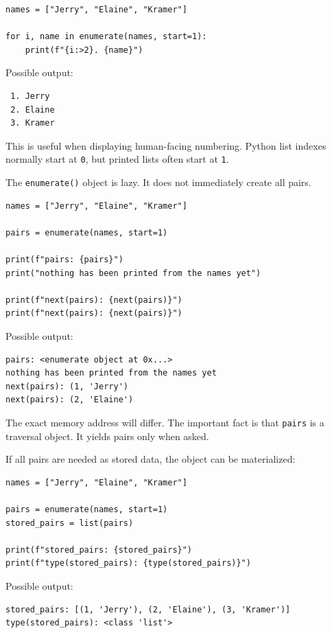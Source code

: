 \documentclass[a4paper,twoside]{report}
\begin{document}
\begin{verbatim}
names = ["Jerry", "Elaine", "Kramer"]

for i, name in enumerate(names, start=1):
    print(f"{i:>2}. {name}")
\end{verbatim}

Possible output:

\begin{verbatim}
 1. Jerry
 2. Elaine
 3. Kramer
\end{verbatim}

This is useful when displaying human-facing numbering. Python list indexes normally start at \texttt{0}, but printed lists often start at \texttt{1}.

The \texttt{enumerate()} object is lazy. It does not immediately create all pairs.

\begin{verbatim}
names = ["Jerry", "Elaine", "Kramer"]

pairs = enumerate(names, start=1)

print(f"pairs: {pairs}")
print("nothing has been printed from the names yet")

print(f"next(pairs): {next(pairs)}")
print(f"next(pairs): {next(pairs)}")
\end{verbatim}

Possible output:

\begin{verbatim}
pairs: <enumerate object at 0x...>
nothing has been printed from the names yet
next(pairs): (1, 'Jerry')
next(pairs): (2, 'Elaine')
\end{verbatim}

The exact memory address will differ. The important fact is that \texttt{pairs} is a traversal object. It yields pairs only when asked.

If all pairs are needed as stored data, the object can be materialized:

\begin{verbatim}
names = ["Jerry", "Elaine", "Kramer"]

pairs = enumerate(names, start=1)
stored_pairs = list(pairs)

print(f"stored_pairs: {stored_pairs}")
print(f"type(stored_pairs): {type(stored_pairs)}")
\end{verbatim}

Possible output:

\begin{verbatim}
stored_pairs: [(1, 'Jerry'), (2, 'Elaine'), (3, 'Kramer')]
type(stored_pairs): <class 'list'>
\end{verbatim}
\end{document}
